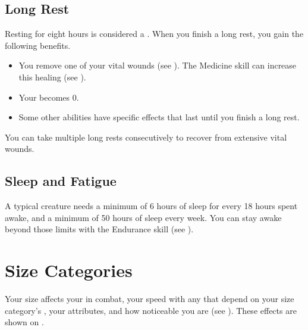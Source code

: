     \subsection{Long Rest}\label{Long Rest}
        Resting for eight hours is considered a .
        When you finish a long rest, you gain the following benefits.
        \begin{itemize}
            \item You remove one of your vital wounds (see ).
                The Medicine skill can increase this healing (see ).
            \item Your  becomes 0.
            \item Some other abilities have specific effects that last until you finish a long rest.
        \end{itemize}

        You can take multiple long rests consecutively to recover from extensive vital wounds.

    \subsection{Sleep and Fatigue}\label{Sleep and Fatigue}
        A typical creature needs a minimum of 6 hours of sleep for every 18 hours spent awake, and a minimum of 50 hours of sleep every week.
        You can stay awake beyond those limits with the Endurance skill (see ).

\section{Size Categories}\label{Size Categories}
    Your size affects your  in combat, your speed with any  that depend on your size category's , your attributes, and how noticeable you are (see ).
    These effects are shown on .


